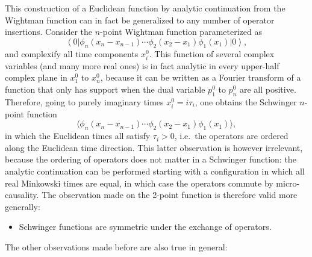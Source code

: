 \documentclass[a4paper,12pt]{article}
\newcommand{\ket}[1]{\left| #1 \right\rangle}
\newcommand{\bra}[1]{\left\langle #1 \right|}
\numberwithin{equation}{section}
\begin{document}
This construction of a Euclidean function by analytic continuation from the Wightman function can in fact be generalized to any number of operator insertions. Consider the $n$-point Wightman function parameterized as
\begin{equation}
	\bra{0} \phi_n(x_n - x_{n-1}) \cdots
	\phi_2(x_2 - x_1) \phi_1(x_1) \ket{0},
\end{equation}
and complexify all time components $x_i^0$. This function of several complex variables (and many more real ones) is in fact analytic in every upper-half complex plane in $x_1^0$ to $x_n^0$, because it can be written as a Fourier transform of a function that only has support when the dual variable $p_1^0$ to $p_n^0$ are all positive. Therefore, going to purely imaginary times $x_i^0 = i \tau_i$, one obtains the Schwinger $n$-point function
\begin{equation}
	\langle \phi_n(x_n - x_{n-1}) \cdots
	\phi_2(x_2 - x_1) \phi_1(x_1) \rangle,
\end{equation}
in which the Euclidean times all satisfy $\tau_i > 0$, i.e.~the operators are ordered along the Euclidean time direction. 
This latter observation is however irrelevant, because the ordering of operators does not matter in a Schwinger function: the analytic continuation can be performed starting with a configuration in which all real Minkowski times are equal, in which case the operators commute by micro-causality. 
The observation made on the 2-point function is therefore valid more generally: 
\begin{itemize}

\item
Schwinger functions are symmetric under the exchange of operators.

\end{itemize} 
The other observations made before are also true in general: 
\end{document}
